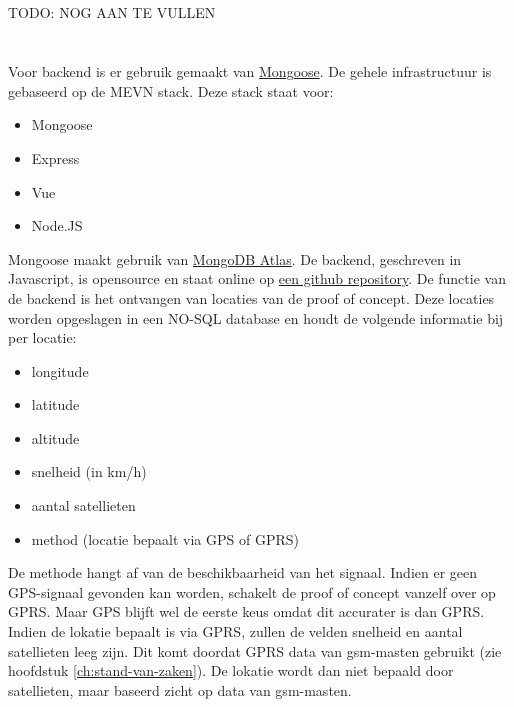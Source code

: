 \subsection{}
TODO: NOG AAN TE VULLEN
\pagebreak
\section{}
\label{ch:backend}

\subsection{}
Voor backend is er gebruik gemaakt van \href{https://mongoosejs.com/}{Mongoose}. De gehele infrastructuur is gebaseerd op de MEVN stack.
Deze stack staat voor:
\begin{itemize}
	\item Mongoose
	\item Express
	\item Vue
	\item Node.JS
\end{itemize}
Mongoose maakt gebruik van \href{https://www.mongodb.com/cloud/atlas}{MongoDB Atlas}. De backend, geschreven in Javascript, is opensource en staat online op \href{https://github.com/IndyVC/bap-backend}{een github repository}.
\newline
De functie van de backend is het ontvangen van locaties van de proof of concept. Deze locaties worden opgeslagen in een NO-SQL database en houdt de volgende informatie bij per locatie:
\begin{itemize}
	\item longitude
	\item latitude
	\item altitude
	\item snelheid (in km/h)
	\item aantal satellieten
	\item method (locatie bepaalt via GPS of GPRS)
\end{itemize}
De methode hangt af van de beschikbaarheid van het signaal. Indien er geen GPS-signaal gevonden kan worden, schakelt de proof of concept vanzelf over op GPRS. Maar GPS blijft wel de eerste keus omdat dit accurater is dan GPRS. Indien de lokatie bepaalt is via GPRS, zullen de velden snelheid en aantal satellieten leeg zijn. Dit komt doordat GPRS data van gsm-masten gebruikt (zie hoofdstuk \ref{ch:stand-van-zaken}). De lokatie wordt dan niet bepaald door satellieten, maar baseerd zicht op data van gsm-masten. 


